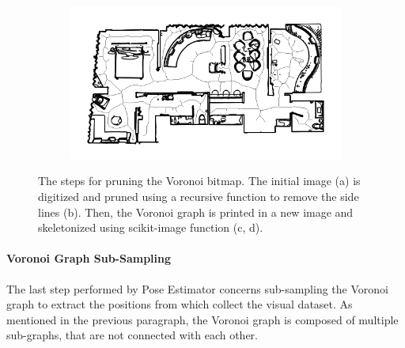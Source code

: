 \begin{figure}[h!]
\begin{subfigure}[b]{0.49\linewidth}
		\caption{}
		\label{fig:pose_estimator_skelethon}
	\end{subfigure}
	\hfil
	\begin{subfigure}[b]{0.49\linewidth}
		\centering
		\includegraphics[width=\textwidth]{images/pose_estimator_skelethon_map.png}
		\caption{}
		\label{fig:pose_estimator_skelethon_map}
	\end{subfigure}
	\caption{The steps for pruning the Voronoi bitmap. The initial image (a) is digitized and pruned using a recursive function to remove the side lines (b). Then, the Voronoi graph is printed in a new image and skeletonized using scikit-image function (c, d). }
\end{figure}

\paragraph*{Voronoi Graph Sub-Sampling} The last step performed by Pose Estimator concerns sub-sampling the Voronoi graph to extract the positions from which collect the visual dataset. As mentioned in the previous paragraph, the Voronoi graph is composed of multiple sub-graphs, that are not connected with each other. 

